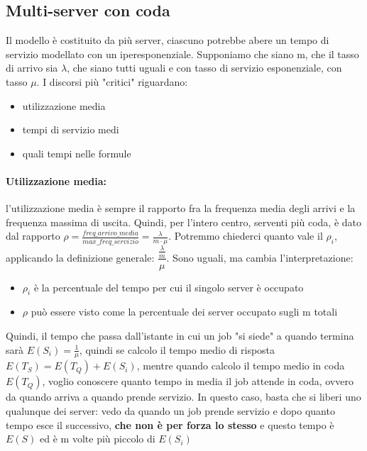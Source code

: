\documentclass{article}
\begin{document}
\subsection{Multi-server con coda }
Il modello è costituito da più server, ciascuno potrebbe abere un tempo di servizio modellato con un iperesponenziale. Supponiamo che siano m, che il tasso di arrivo sia $\lambda$, che siano tutti uguali e con tasso di servizio esponenziale, con tasso $\mu$. I discorsi più "critici" riguardano:
\begin{itemize}
\item utilizzazione media
\item tempi di servizio medi
\item quali tempi nelle formule
\end{itemize}
\paragraph{Utilizzazione media:}l'utilizzazione media è sempre il rapporto fra la frequenza media degli arrivi e la frequenza massima di uscita. Quindi, per l'intero centro, serventi più coda, è dato dal rapporto $\rho = \frac{freq\_arrivo\_media}{max\_freq\_servizio} = \frac{\lambda}{m\cdot \mu}$. Potremmo chiederci quanto vale il $\rho_i$, applicando la definizione generale: $\dfrac{\frac{\lambda}{m}}{\mu}$. Sono uguali, ma cambia l'interpretazione:
\begin{itemize}
\item $\rho_i$ è la percentuale del tempo per cui il singolo server è occupato
\item $\rho$ può essere visto come la percentuale dei server occupato sugli m totali
\end{itemize}
Quindi, il tempo che passa dall'istante in cui un job "si siede" a quando termina sarà $E(S_i) = \frac{1}{\mu}$, quindi se calcolo il tempo medio di risposta $E(T_S) = E(T_Q) + E(S_i)$, mentre quando calcolo il tempo medio in coda $E(T_Q)$, voglio conoscere quanto tempo in media il job attende in coda, ovvero da quando arriva a quando prende servizio. In questo caso, basta che si liberi uno qualunque dei server: vedo da quando un job prende servizio e dopo quanto tempo esce il successivo, \textbf{che non è per forza lo stesso} e questo tempo è $E(S)$ ed è m volte più piccolo di $E(S_i)$
\end{document}
